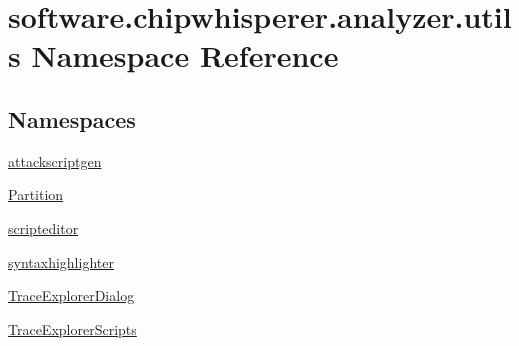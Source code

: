 \hypertarget{namespacesoftware_1_1chipwhisperer_1_1analyzer_1_1utils}{}\section{software.\+chipwhisperer.\+analyzer.\+utils Namespace Reference}
\label{namespacesoftware_1_1chipwhisperer_1_1analyzer_1_1utils}
\subsection*{Namespaces}
\begin{DoxyCompactItemize}
\item 
 \hyperlink{namespacesoftware_1_1chipwhisperer_1_1analyzer_1_1utils_1_1attackscriptgen}{attackscriptgen}
\item 
 \hyperlink{namespacesoftware_1_1chipwhisperer_1_1analyzer_1_1utils_1_1Partition}{Partition}
\item 
 \hyperlink{namespacesoftware_1_1chipwhisperer_1_1analyzer_1_1utils_1_1scripteditor}{scripteditor}
\item 
 \hyperlink{namespacesoftware_1_1chipwhisperer_1_1analyzer_1_1utils_1_1syntaxhighlighter}{syntaxhighlighter}
\item 
 \hyperlink{namespacesoftware_1_1chipwhisperer_1_1analyzer_1_1utils_1_1TraceExplorerDialog}{Trace\+Explorer\+Dialog}
\item 
 \hyperlink{namespacesoftware_1_1chipwhisperer_1_1analyzer_1_1utils_1_1TraceExplorerScripts}{Trace\+Explorer\+Scripts}
\end{DoxyCompactItemize}

